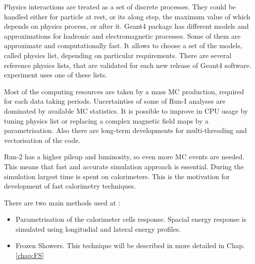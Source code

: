 Physics interactions are treated as a set of discrete processes. They could be handled either for particle at rest, or its along step, the maximum value of which depends on physics process, or after it. Geant4 package has different models and approximations for hadronic and electromagnetic processes. Some of them are approximate and computationally fast. It allows to choose a set of the models, called physics list, depending on particular requirements. There are several reference physics lists, that are validated for each new release of Geant4 software. \atlas experiment uses one of these lists.

Most of the computing resources are taken by a mass MC production, required for each data taking periods. Uncertainties of some of Run-I analyses are dominated by available MC statistics. It is possible to improve in CPU usage by tuning physics list or replacing a complex magnetic field maps by a parametrisation. Also there are long-term developments for multi-threading and vectorisation of the code. 

Run-2 has a higher pileup and luminosity, so even more MC events are needed. This means that fast and accurate simulation approach is essential. During the simulation largest time is spent on calorimeters. This is the motivation for development of fast calorimetry techniques.  

There are two main methods used at \atlas:
\begin{itemize}
\item Parametrisation of the calorimeter cells response. Spacial energy response is simulated using longitudial and lateral energy profiles.
\item Frozen Showers. This technique will be described in more detailed in Chap. \ref{chap:FS}
\end{itemize}

